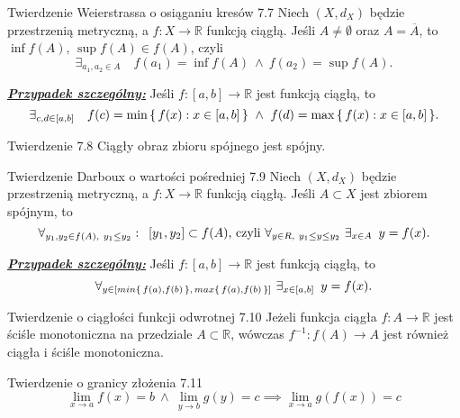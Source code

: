 \documentclass{article}
\newcommand{\hquad}{\mkern9mu}
\newcommand{\R}{\mathbb{R}}
\newcommand*\closure[1]{\overline{#1}}
\begin{document}
\begin{twier}{Twierdzenie Weierstrassa o osiąganiu kresów 7.7} %
Niech $(X, d_X)$ będzie przestrzenią metryczną, a $f:X\to\R$ funkcją ciągłą. Jeśli $A\neq\emptyset$ oraz $A=\closure{A}$, to
$\inf{f(A)},\, \sup{f(A)}\in f(A)$, czyli
\begin{equation*}
    \exists_{a_1, a_2\in A}\quad f(a_1) = \inf{f(A)}\ \land\ f(a_2) = \sup{f(A)}.
\end{equation*}
\end{twier}

\textit{\textbf{\underline{Przypadek szczególny:}}} Jeśli $f:[a,b]\to\R$ jest funkcją ciągłą, to
\begin{equation*}
    \exists_{c, d\in[a,b]}\quad f(c)=\min{\set{f(x):x\in[a,b]}}\ \land\ f(d)=\max{\set{f(x):x\in[a,b]}}.
\end{equation*}

\begin{twier}{Twierdzenie 7.8}
    Ciągły obraz zbioru spójnego jest spójny.
\end{twier}

\begin{twier}{Twierdzenie Darboux o wartości pośredniej 7.9}
    Niech $(X, d_X)$ będzie przestrzenią metryczną, a $f:X\to\R$ funkcją ciągłą. Jeśli $A\subset X$ jest zbiorem spójnym, to
    \begin{equation*}
        \forall_{y_1, y_2\in f(A),\ y_1\le y_2}:\hquad [y_1, y_2]\subset f(A)\text{, czyli }\forall_{y\in R,\ y_1\le y\le y_2}\ \exists_{x\in A}\hquad y=f(x).
    \end{equation*}
\end{twier}

\textit{\textbf{\underline{Przypadek szczególny:}}} Jeśli $f:[a,b]\to\R$ jest funkcją ciągłą, to
\begin{equation*}
    \forall_{y\in[min{\set{f(a),f(b)}},\, max{\set{f(a),f(b)}}]}\ \exists_{x\in[a,b]}\hquad y=f(x).
\end{equation*}

\begin{twier}{Twierdzenie o ciągłości funkcji odwrotnej 7.10}
    Jeżeli funkcja ciągła $f:A\to\R$ jest ściśle monotoniczna na przedziale $A\subset\R$, wówczas
    $f^{-1}:f(A)\to A$ jest również ciągła i ściśle monotoniczna.
\end{twier}

\begin{twier}{Twierdzenie o granicy złożenia 7.11}
    $$\lim_{x\to a}{f(x)}=b\ \land\ \lim_{y\to b}{g(y)=c}\implies \lim_{x\to a}{g(f(x))=c}$$
\end{twier}
\newpage
\end{document}
